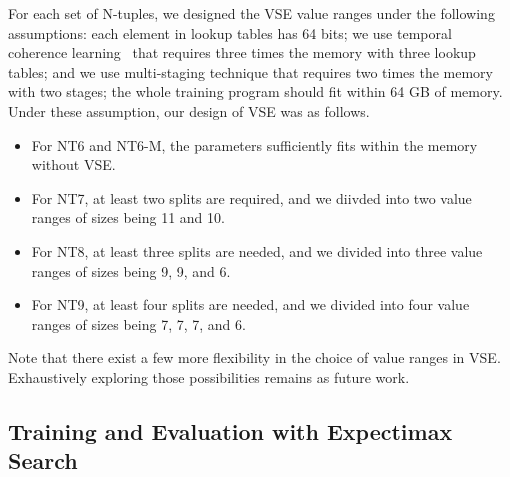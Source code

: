For each set of N-tuples, we designed the VSE value ranges under the following assumptions: each element in lookup tables has 64 bits; we use temporal coherence learning~\cite{Jask18} that requires three times the memory with three lookup tables; and we use multi-staging technique that requires two times the memory with two stages; the whole training program should fit within 64 GB of memory.
Under these assumption, our design of VSE was as follows.
\begin{itemize}
\item For NT6 and NT6-M, the parameters sufficiently fits within the memory without VSE.
\item For NT7, at least two splits are required, and we diivded into two value ranges of sizes being 11 and 10.
\item For NT8, at least three splits are needed, and we divided into three value ranges of sizes being 9, 9, and 6.
\item For NT9, at least four splits are needed, and we divided into four value ranges of sizes being 7, 7, 7, and 6.
\end{itemize}

Note that there exist a few more flexibility in the choice of value ranges in VSE.
Exhaustively exploring those possibilities remains as future work.

\subsection{Training and Evaluation with Expectimax Search}

